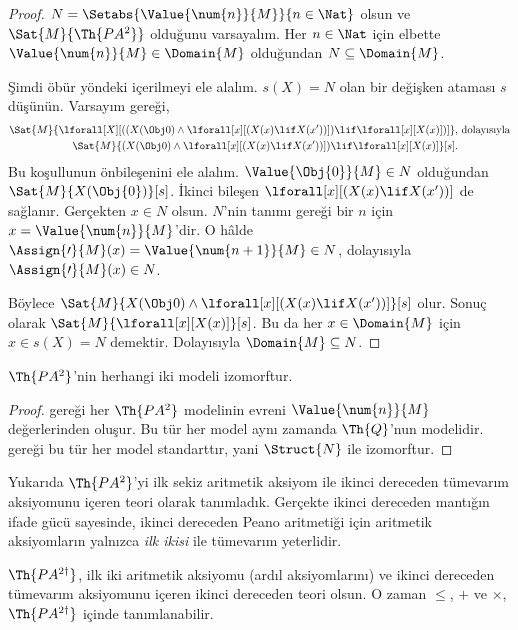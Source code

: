 \begin{proof}
$N=\Setabs{\Value{\num{n}}{M}}{n\in\Nat}$ olsun ve
$\Sat{M}{\Th{PA^2}}$ olduğunu varsayalım. Her $n\in\Nat$ için elbette
$\Value{\num{n}}{M}\in\Domain{M}$ olduğundan $N\subseteq\Domain{M}$.

Şimdi öbür yöndeki içerilmeyi ele alalım. $s(X)=N$ olan bir değişken ataması
$s$ düşünün. Varsayım gereği,
\begin{align*}
\Sat{M}{\lforall[X][((X(\Obj 0) \land \lforall[x][(X(x)
      \lif X(x'))]) \lif \lforall[x][X(x)])]}, & \text{ dolayısıyla}\\
\Sat{M}{(X(\Obj 0) \land \lforall[x][(X(x) \lif X(x'))]) \lif
  \lforall[x][X(x)]}[s]. & 
\end{align*}
Bu koşullunun önbileşenini ele alalım. $\Value{\Obj{0}}{M}\in N$ olduğundan
$\Sat{M}{X(\Obj{0})}[s]$. İkinci bileşen
$\lforall[x][(X(x)\lif X(x'))]$ de sağlanır. Gerçekten $x\in N$ olsun.
$N$'nin tanımı gereği bir $n$ için $x=\Value{\num{n}}{M}$'dir. O hâlde
$\Assign{\prime}{M}(x)=\Value{\num{n+1}}{M}\in N$, dolayısıyla
$\Assign{\prime}{M}(x)\in N$.

Böylece $\Sat{M}{X(\Obj 0) \land \lforall[x][(X(x) \lif X(x'))]}[s]$ olur.
Sonuç olarak $\Sat{M}{\lforall[x][X(x)]}[s]$. Bu da her
$x\in\Domain{M}$ için $x\in s(X)=N$ demektir. Dolayısıyla
$\Domain{M}\subseteq N$.
\end{proof}

\begin{cor}
$\Th{PA^2}$'nin herhangi iki modeli izomorftur.
\end{cor}

\begin{proof}
 gereği her $\Th{PA^2}$ modelinin evreni
$\Value{\num{n}}{M}$ değerlerinden oluşur. Bu tür her model aynı zamanda
$\Th{Q}$'nun modelidir.  gereği bu
tür her model standarttır, yani $\Struct{N}$ ile izomorftur.
\end{proof}

Yukarıda $\Th{PA^2}$'yi ilk sekiz aritmetik aksiyom ile ikinci dereceden
tümevarım aksiyomunu içeren teori olarak tanımladık. Gerçekte ikinci
dereceden mantığın ifade gücü sayesinde, ikinci dereceden Peano aritmetiği
için aritmetik aksiyomların yalnızca \emph{ilk ikisi} ile tümevarım yeterlidir.

\begin{prop}
$\Th{PA^{2\dagger}}$, ilk iki aritmetik aksiyomu (ardıl aksiyomlarını) ve
ikinci dereceden tümevarım aksiyomunu içeren ikinci dereceden teori olsun.
O zaman $\le$, $+$ ve $\times$, $\Th{PA^{2\dagger}}$ içinde tanımlanabilir.
\end{prop}

